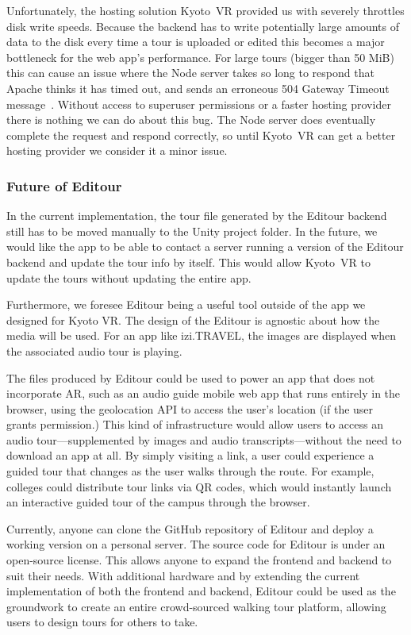 \documentclass[a4paper, 10pt, american, titlepage]{article}
\begin{document}
Unfortunately, the hosting solution Kyoto~VR provided us with severely throttles
disk write speeds. Because the backend has to write potentially large amounts of
data to the disk every time a tour is uploaded or edited this becomes a major
bottleneck for the web app's performance. For large tours (bigger than 50 MiB)
this can cause an issue where the Node server takes so long to respond that
Apache thinks it has timed out, and sends an erroneous 504 Gateway Timeout
message~\autocite{rfc7231}. Without access to superuser permissions or a faster
hosting provider there is nothing we can do about this bug. The Node server does
eventually complete the request and respond correctly, so until Kyoto~VR can get
a better hosting provider we consider it a minor issue.

\subsubsection{Future of Editour}
\label{sec:futureOfEditour}

In the current implementation, the tour file generated by the Editour backend
still has to be moved manually to the Unity project folder. In the future, we
would like the app to be able to contact a server running a version of the
Editour backend and update the tour info by itself. This would allow Kyoto~VR to
update the tours without updating the entire app.

Furthermore, we foresee Editour being a useful tool outside of the app we
designed for Kyoto VR. The design of the Editour is agnostic about how the media
will be used. For an app like izi.TRAVEL, the images are displayed when the
associated audio tour is playing.

The files produced by Editour could be used to power an app that does not
incorporate AR, such as an audio guide mobile web app that runs entirely in the
browser, using the geolocation API to access the user's location (if the user
grants permission.) This kind of infrastructure would allow users to access an
audio tour---supplemented by images and audio transcripts---without the need to
download an app at all. By simply visiting a link, a user could experience a
guided tour that changes as the user walks through the route. For example,
colleges could distribute tour links via QR codes, which would instantly launch
an interactive guided tour of the campus through the browser.

Currently, anyone can clone the GitHub repository of Editour and deploy a
working version on a personal server. The source code for Editour is under an
open-source license. This allows anyone to expand the frontend and backend to
suit their needs. With additional hardware and by extending the current
implementation of both the frontend and backend, Editour could be used as the
groundwork to create an entire crowd-sourced walking tour platform, allowing
users to design tours for others to take.
\end{document}
